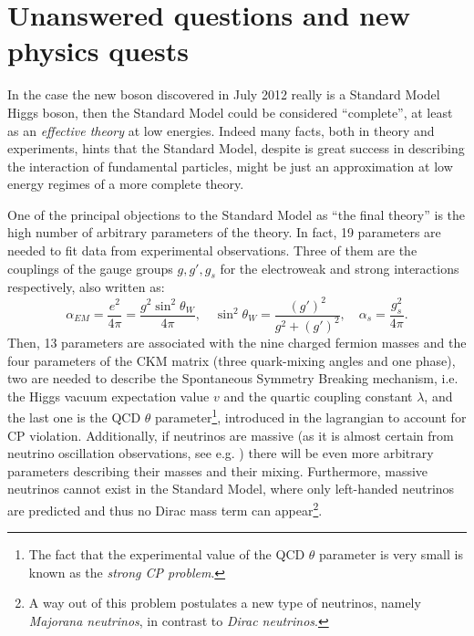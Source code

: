 
\section{Unanswered questions and new physics quests}\label{sec:THquest}

In the case the new boson discovered in July 2012 
really is a Standard Model Higgs boson, then the
Standard Model could be considered ``complete'', at least 
as an {\it effective theory} at low energies. Indeed many facts, both 
in theory and experiments, hints that the Standard Model,
despite is great success in describing the interaction
of fundamental particles, might be just an approximation
at low energy regimes of a more complete theory.

One of the principal objections to the Standard Model as 
``the final theory'' is the high number of arbitrary parameters 
of the theory. In fact, 19 parameters are needed to fit 
data from experimental observations. 
Three of them  are the couplings of the gauge groups 
$g, g', g_s$ for the electroweak and strong
interactions respectively, also written as: 
\begin{equation}\label{eq:couplings}
\alpha_{EM} = \dfrac{e^{2}}{4\pi} =  \dfrac{g^{2}\sin^{2}\theta_{W}}{4\pi}, 
\quad \sin^{2}\theta_{W} = \dfrac{(g')^{2}}{g^{2}+(g')^{2}}  ,\quad 
\alpha_{s}=\dfrac{g_{s}^{2}}{4\pi}.
\end{equation}
Then, 13 parameters are associated with the nine charged 
fermion masses and the four parameters of the CKM matrix 
(three quark-mixing angles and one phase), 
two are needed to describe the Spontaneous Symmetry Breaking mechanism, 
i.e. the Higgs vacuum expectation value $v$ and 
the quartic coupling constant $\lambda$, and the last one is the 
QCD $\theta$ parameter\footnote{The fact that the experimental value
of the QCD $\theta$ parameter is very small is known as
the {\it strong CP problem}.}, introduced in the lagrangian to account
for CP violation. Additionally, if neutrinos are massive 
(as it is almost certain from neutrino oscillation observations, 
see e.g. \cite{Langacker:817840}) there will be even more arbitrary 
parameters describing their masses and their mixing. 
Furthermore, massive neutrinos cannot exist in the Standard
Model, where only left-handed neutrinos are predicted and thus
no Dirac mass term can appear\footnote{A way out of this
problem postulates a new type of neutrinos, namely 
{\it Majorana neutrinos}, in contrast to {\it Dirac neutrinos}.}.



